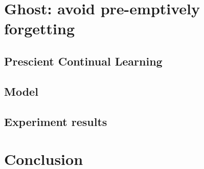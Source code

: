 \section{Ghost: avoid pre-emptively forgetting}

\subsection{Prescient Continual Learning}

\subsection{Model}

\subsection{Experiment results}


\section{Conclusion}

